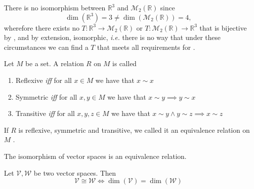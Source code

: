 \begin{exm}\label{exm-isomorphic:3}
	There is no isomorphism between $\mathbb{R}^3$ and $\mathcal{M}_2(\mathbb{R})$ since
	\begin{equation*}
		\dim(\mathbb{R}^3)=3\neq\dim(\mathcal{M}_2(\mathbb{R}))=4,
	\end{equation*}
	wherefore there exists no $T:\mathbb{R}^3\to\mathcal{M}_2(\mathbb{R})$ or
	$T:\mathcal{M}_2(\mathbb{R})\to\mathbb{R}^3$ that is bijective by
	, and by extension, isomorphic,
	\textit{i.e.} there is no way that under these circumstances we can find a
	$T$ that meets all requirements for .
\end{exm}

\begin{definition}\label{def-equivalence-relation}
	Let $M$ be a set. A relation $R$ on $M$ is called
	\begin{enumerate}
		\item Reflexive \textit{iff} for all $x \in M$ we have that $x\sim x$
		\item Symmetric \textit{iff} for all $x,y \in M$ we have that $x \sim y \implies y \sim x$
		\item Transitive \textit{iff} for all $x,y,z \in M$ we have that $x \sim y \land y \sim z \implies x \sim z$
	\end{enumerate}
	If $R$ is reflexive, symmetric and transitive, we called it an equivalence relation on $M$ \cite[p.20]{liesenMehrmann2015}.
\end{definition}

\begin{rem}
	The isomorphism of vector spaces is an equivalence relation.
\end{rem}

\begin{thm}\label{thm-isomorphism-same-dim}
	Let $\mathcal{V},\mathcal{W}$ be two vector spaces. Then
	\begin{equation}
		\mathcal{V}\cong\mathcal{W}\Leftrightarrow\dim(\mathcal{V})=\dim(\mathcal{W})
	\end{equation}
\end{thm}

